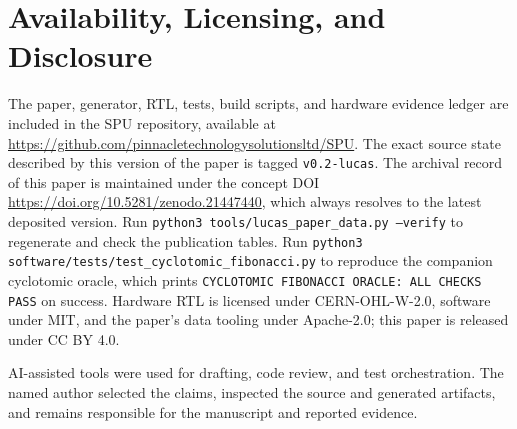 \documentclass[conference]{IEEEtran}
\begin{document}
\section*{Availability, Licensing, and Disclosure}

The paper, generator, RTL, tests, build scripts, and hardware evidence ledger
are included in the SPU repository, available at
\url{https://github.com/pinnacletechnologysolutionsltd/SPU}. The exact source
state described by this version of the paper is tagged
\texttt{v0.2-lucas}. The archival
record of this paper is maintained under the concept DOI
\url{https://doi.org/10.5281/zenodo.21447440}, which always resolves to the
latest deposited version. Run
\texttt{python3 tools/lucas\_paper\_data.py --verify} to regenerate and check
the publication tables. Run \texttt{python3}
\nolinkurl{software/tests/test_cyclotomic_fibonacci.py} to reproduce the
companion cyclotomic oracle, which prints
\texttt{CYCLOTOMIC FIBONACCI ORACLE: ALL CHECKS PASS} on success. Hardware RTL
is licensed under
CERN-OHL-W-2.0,
software under MIT, and the paper's data tooling under Apache-2.0; this paper
is released under CC BY 4.0.

AI-assisted tools were used for drafting, code review, and test orchestration.
The named author selected the claims, inspected the source and generated
artifacts, and remains responsible for the manuscript and reported evidence.
\end{document}

